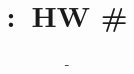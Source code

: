\newcommand{\sol}[1]{
	\begin{tcolorbox}[breakable, enhanced]
		#1
	\end{tcolorbox}
}



\newcommand{\assignmentSection}[1]{
	{
		\centering %
		\vspace{2\baselineskip} %
		
		\rule{0.8\textwidth}{0.5pt} %
		
		\vspace{0.75\baselineskip} %
		{\LARGE \MakeUppercase{#1}} %
		
		\rule{0.8\textwidth}{0.5pt} %
		
		\vspace{\baselineskip} %
	}
}

\newcommand{\codeword}{\texttt}


\author{\textbf{\studentName} - \studentNumber \ifdef{\studentID}{ - \studentID}{}} %
\date{} %

\title{
	\thispagestyle{empty} %
	\textbf{\classTitle}\\
	\textbf{\assignmentClassCode:\ HW \#\assignmentTitle}\\[-4pt]
	\ifdef{\assignmentClassInstructor}{{\large \textit{\assignmentClassInstructor}}}{} %
}
